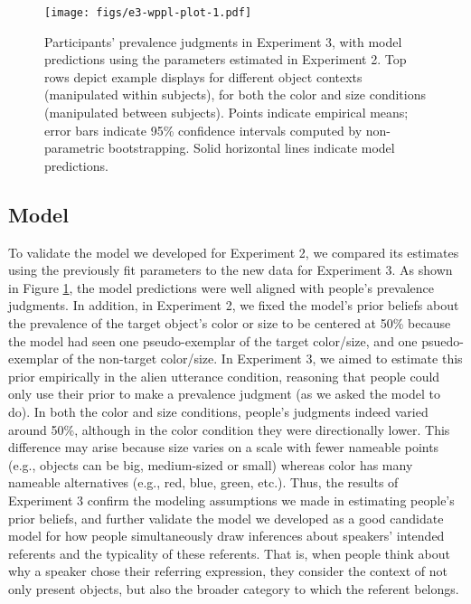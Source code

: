 \documentclass[
  english,
  man,floatsintext]{apa6}
\begin{document}
\begin{figure}
\centering
\texttt{[image: figs/e3-wppl-plot-1.pdf]}
\caption{\label{fig:e3-wppl-plot}Participants' prevalence judgments in Experiment 3, with model predictions using the parameters estimated in Experiment 2. Top rows depict example displays for different object contexts (manipulated within subjects), for both the color and size conditions (manipulated between subjects). Points indicate empirical means; error bars indicate 95\% confidence intervals computed by non-parametric bootstrapping. Solid horizontal lines indicate model predictions.}
\end{figure}

\hypertarget{model-2}{%
\subsection{Model}\label{model-2}}

To validate the model we developed for Experiment 2, we compared its estimates using the previously fit parameters to the new data for Experiment 3. As shown in Figure \ref{fig:e3-wppl-plot}, the model predictions were well aligned with people's prevalence judgments. In addition, in Experiment 2, we fixed the model's prior beliefs about the prevalence of the target object's color or size to be centered at 50\% because the model had seen one pseudo-exemplar of the target color/size, and one psuedo-exemplar of the non-target color/size. In Experiment 3, we aimed to estimate this prior empirically in the alien utterance condition, reasoning that people could only use their prior to make a prevalence judgment (as we asked the model to do). In both the color and size conditions, people's judgments indeed varied around 50\%, although in the color condition they were directionally lower. This difference may arise because size varies on a scale with fewer nameable points (e.g., objects can be big, medium-sized or small) whereas color has many nameable alternatives (e.g., red, blue, green, etc.). Thus, the results of Experiment 3 confirm the modeling assumptions we made in estimating people's prior beliefs, and further validate the model we developed as a good candidate model for how people simultaneously draw inferences about speakers' intended referents and the typicality of these referents. That is, when people think about why a speaker chose their referring expression, they consider the context of not only present objects, but also the broader category to which the referent belongs.
\end{document}
